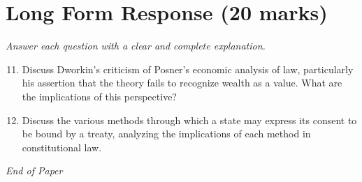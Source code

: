 \documentclass[12pt]{article}
\begin{document}
\section*{Long Form Response (20 marks)}
\textit{Answer each question with a clear and complete explanation.}
\begin{enumerate}[label=\arabic*.]
\setcounter{enumi}{10}
\item Discuss Dworkin's criticism of Posner's economic analysis of law, particularly his assertion that the theory fails to recognize wealth as a value. What are the implications of this perspective?
\item Discuss the various methods through which a state may express its consent to be bound by a treaty, analyzing the implications of each method in constitutional law.
\end{enumerate}

\vfill
\noindent\textit{End of Paper}
\end{document}
